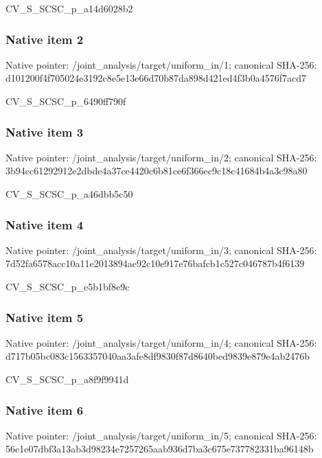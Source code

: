 \documentclass[10pt,a4paper]{article}
\begin{document}
CV\_S\_SCSC\_p\_a14d6028b2


\subsubsection{Native item 2}


Native pointer: /joint\_analysis/target/uniform\_in/1; canonical SHA-256: d101200f4f705024e3192c8e\allowbreak{}5e13e66d70b87da898d421ed\allowbreak{}4f3b0a4576f7acd7


CV\_S\_SCSC\_p\_6490ff790f


\subsubsection{Native item 3}


Native pointer: /joint\_analysis/target/uniform\_in/2; canonical SHA-256: 3b94cc61292912e2dbde4a37\allowbreak{}ce4420c6b81ce6f366ec9c18\allowbreak{}c41684b4a3c98a80


CV\_S\_SCSC\_p\_a46dbb5c50


\subsubsection{Native item 4}


Native pointer: /joint\_analysis/target/uniform\_in/3; canonical SHA-256: 7d52fa6578acc10a11e20138\allowbreak{}94ae92c10e917e76bafcb1c5\allowbreak{}27c046787b4f6139


CV\_S\_SCSC\_p\_e5b1bf8e9c


\subsubsection{Native item 5}


Native pointer: /joint\_analysis/target/uniform\_in/4; canonical SHA-256: d717b05bc083c1563357040a\allowbreak{}a3afe8df9830f87d8640bed9\allowbreak{}839e879e4ab2476b


CV\_S\_SCSC\_p\_a8f9f9941d


\subsubsection{Native item 6}


Native pointer: /joint\_analysis/target/uniform\_in/5; canonical SHA-256: 56c1e07dbf3a13ab3d98234e\allowbreak{}7257265aab936d7ba3c675e7\allowbreak{}37782331ba96148b
\end{document}
